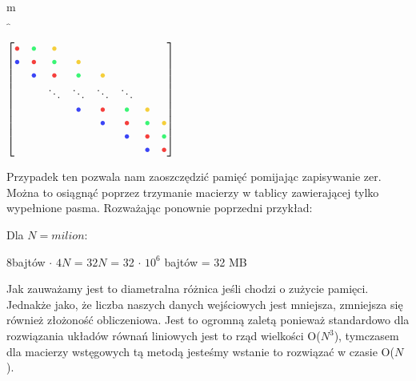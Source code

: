\documentclass{article}
\begin{document}
  \begin{center}
    
    
    \begin{minipage}[t]{0.14\textwidth} %
    \hspace{0.05cm} m\\
    $\overbrace{}$ 
    \end{minipage}

    \begin{minipage}{0.3\textwidth}

    $\begin{bmatrix}
                  \textcolor{red}{\bullet}	&	\textcolor{green}{\bullet}	&	\textcolor{yellow}{\bullet}	\\
                  \textcolor{blue}{\bullet}	&	\textcolor{red}{\bullet}	&	\textcolor{green}{\bullet}	&	\textcolor{yellow}{\bullet}	\\
      &		        \textcolor{blue}{\bullet}	&	\textcolor{red}{\bullet}	&	\textcolor{green}{\bullet}	&	\textcolor{yellow}{\bullet}	\\
      & &		      \ddots	&	\ddots	&	\ddots	&	\ddots	\\
      & & &		    \textcolor{blue}{\bullet}	&	\textcolor{red}{\bullet}	&	\textcolor{green}{\bullet}	&	\textcolor{yellow}{\bullet}	\\
      & & & &	    \textcolor{blue}{\bullet}	&	\textcolor{red}{\bullet}	&	\textcolor{green}{\bullet}	&	\textcolor{yellow}{\bullet}	\\
      & & & & &  	\textcolor{blue}{\bullet}	&	\textcolor{red}{\bullet}	&	\textcolor{green}{\bullet}	\\
      & & & & & &	\textcolor{blue}{\bullet}	&	\textcolor{red}{\bullet}	\\
    \end{bmatrix}$
  \end{minipage}
  \end{center}
  Przypadek ten pozwala nam zaoszczędzić pamięć pomijając zapisywanie zer. Można to osiągnąć poprzez trzymanie macierzy w tablicy zawierającej tylko wypełnione pasma. Rozważając ponownie poprzedni przykład:
  \begin{flushleft}
    Dla $N = milion$:
  \end{flushleft}

  \begin{center}
    8bajtów $\cdot$ $4N$ = $32N$ = 32 $\cdot$ $10^{6}$ bajtów = 32 MB
  \end{center}
  Jak zauważamy jest to diametralna różnica jeśli chodzi o zużycie pamięci.\\
  Jednakże jako, że liczba naszych danych wejściowych jest mniejsza, zmniejsza się również złożoność obliczeniowa. Jest to ogromną zaletą ponieważ standardowo dla rozwiązania układów równań liniowych jest to rząd wielkości O($N^3$), tymczasem
  dla macierzy wstęgowych tą metodą jesteśmy wstanie to rozwiązać w czasie O($N$).
\end{document}
